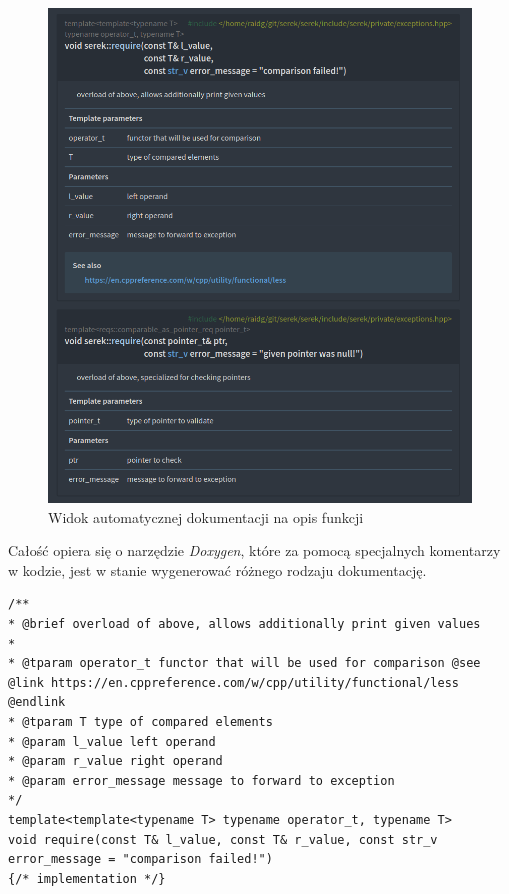 \documentclass[12pt]{article}
\newcommand{\n}{\newline}
\begin{document}
{{{				\begin{figure}[H]
					\centering
					\includegraphics[width=15cm,keepaspectratio=true]{./img/documentation_part_2.png}
					\caption*{Widok automatycznej dokumentacji na opis funkcji}
					\medskip
				\end{figure}

				\newpage

				Całość opiera się o narzędzie {\it Doxygen}\cite{doxygen_docs}, które za pomocą specjalnych komentarzy w kodzie,
				jest w stanie wygenerować różnego rodzaju dokumentację.\n

				\begin{lstlisting}[frame=single]
/**
* @brief overload of above, allows additionally print given values
*
* @tparam operator_t functor that will be used for comparison @see @link https://en.cppreference.com/w/cpp/utility/functional/less @endlink
* @tparam T type of compared elements
* @param l_value left operand
* @param r_value right operand
* @param error_message message to forward to exception
*/
template<template<typename T> typename operator_t, typename T>
void require(const T& l_value, const T& r_value, const str_v error_message = "comparison failed!")
{/* implementation */}


\end{lstlisting}}}}
\end{document}
